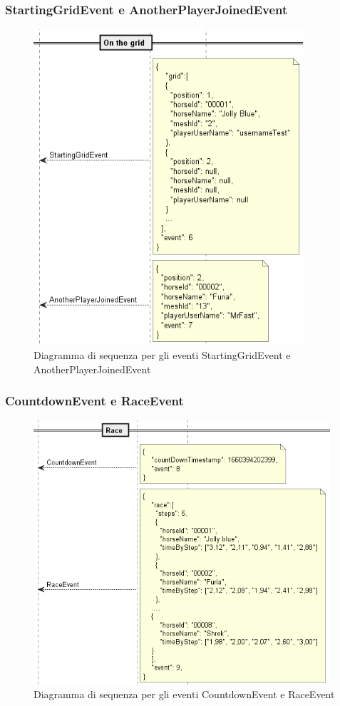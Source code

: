         \subsubsection{StartingGridEvent e AnotherPlayerJoinedEvent}

        \begin{figure}[!ht]
            \centering
            \includegraphics[width=10cm]{figure/StartingGrid.png}
            \caption{Diagramma di sequenza per gli eventi StartingGridEvent e AnotherPlayerJoinedEvent}
        \end{figure}

        \subsubsection{CountdownEvent e RaceEvent}

        \begin{figure}[!ht]
            \centering
            \includegraphics[width=11cm]{figure/CountdownEvent.png}
            \caption{Diagramma di sequenza per gli eventi CountdownEvent e RaceEvent}
        \end{figure}

